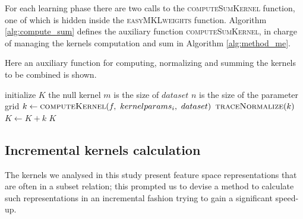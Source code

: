 For each learning phase there are two calls to the \textsc{computeSumKernel}
function, one of which is hidden inside the \textsc{easyMKLweights} function.
Algorithm \ref{alg:compute_sum} defines the auxiliary function \textsc{computeSumKernel},
in charge of managing the kernels computation and sum in Algorithm \ref{alg:method_me}.

\begin{algorithm}
    \caption{
        Here an auxiliary function for computing, normalizing and summing the
        kernels to be combined is shown.
    }
    \label{alg:compute_sum}
    \begin{algorithmic}[1]
            \State initialize $K$ the null kernel
            \Comment $m$ is the size of $dataset$
            \Comment $n$ is the size of the parameter grid
            \State $k \gets \Call{computeKernel}{f,~kernelparams_i,~dataset}$
                    \State $\Call{traceNormalize}{k}$
                    \State $K \gets K+k$
                \EndFor
            \EndFor
            \State \Return $K$
        \EndFunction
    \end{algorithmic}
\end{algorithm}

\subsection{Incremental kernels calculation} 
\label{subsec:inc}
The kernels we analysed in this study present feature space representations
that are often in a subset relation; this prompted us to devise a method to
calculate such representations in an incremental fashion trying to gain a
significant speed-up.

